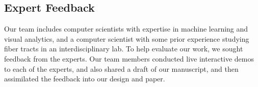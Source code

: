 


\vspace*{-0.06in}
\subsection{Expert Feedback}

\noindent Our team includes computer scientists with expertise in machine learning and visual analytics, and a computer scientist with some prior experience studying fiber tracts in an interdisciplinary lab. To help evaluate our work, we sought feedback from the experts.%
Our team members conducted live interactive demos to each of the experts, and also shared a draft of our manuscript, and then assimilated the feedback into our design and paper.

